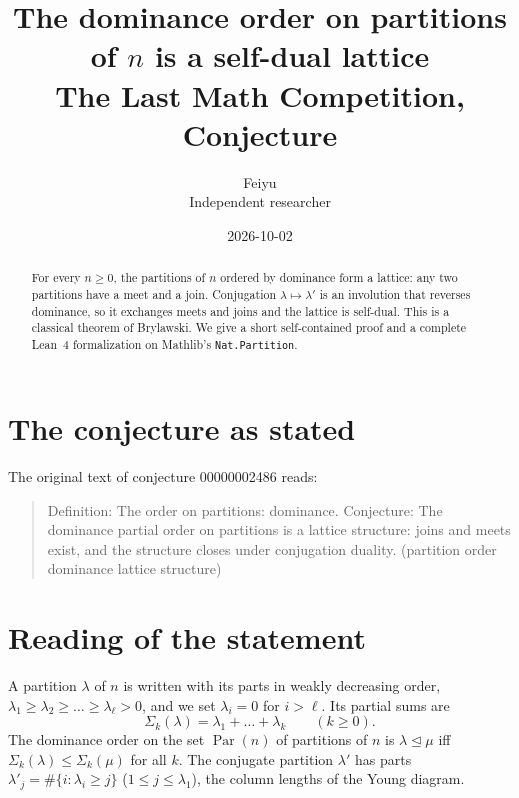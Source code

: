 \documentclass[11pt]{article}
\title{The dominance order on partitions of $n$ is a self-dual lattice\\[0.4em]\large The Last Math Competition, Conjecture \conjid}
\author{Feiyu\\ \small Independent researcher}
\date{2026-10-02}
\theoremstyle{plain}
\theoremstyle{definition}
\theoremstyle{remark}
\newcommand{\conjid}{00000002486}
\newcommand{\Par}{\operatorname{Par}}
\newcommand{\dom}{\trianglelefteq}
\begin{document}
\maketitle

\begin{abstract}
For every $n\ge0$, the partitions of $n$ ordered by dominance form a lattice:
any two partitions have a meet and a join. Conjugation $\lambda\mapsto\lambda'$ is
an involution that reverses dominance, so it exchanges meets and joins and the
lattice is self-dual. This is a classical theorem of Brylawski. We give a short
self-contained proof and a complete Lean~4 formalization on Mathlib's
\texttt{Nat.Partition}.
\end{abstract}

\section{The conjecture as stated}

The original text of conjecture \conjid{} reads:

\begin{quote}
Definition: The order on partitions: dominance. Conjecture: The dominance partial order on partitions is a lattice structure: joins and meets exist, and the structure closes under conjugation duality. (partition order dominance lattice structure)
\end{quote}

\section{Reading of the statement}


A partition $\lambda$ of $n$ is written with its parts in weakly decreasing
order, $\lambda_1\ge\lambda_2\ge\dots\ge\lambda_\ell>0$, and we set $\lambda_i=0$
for $i>\ell$. Its partial sums are
\[
  \Sigma_k(\lambda)=\lambda_1+\dots+\lambda_k\qquad(k\ge0).
\]
The dominance order on the set $\Par(n)$ of partitions of $n$ is
$\lambda\dom\mu$ iff $\Sigma_k(\lambda)\le\Sigma_k(\mu)$ for all $k$. The
conjugate partition $\lambda'$ has parts $\lambda'_j=\#\{i:\lambda_i\ge j\}$
($1\le j\le\lambda_1$), the column lengths of the Young diagram.
\end{document}
